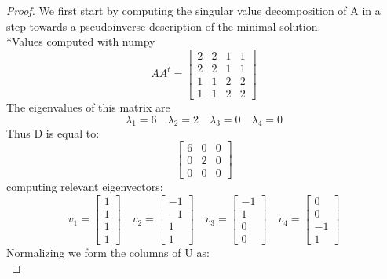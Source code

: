 \documentclass[12pt]{article}
\begin{document}
\begin{proof}
  We first start by computing the singular value decomposition of A in a step towards a pseudoinverse description of the minimal solution. \\
  *Values computed with numpy\\
  \[
    AA^t=\begin{bmatrix}
      2&2&1&1\\2&2&1&1\\1&1&2&2\\1&1&2&2
  \end{bmatrix}
  \]The eigenvalues of this matrix are \[
    \lambda_1=6\quad\lambda_2=2\quad\lambda_3=0\quad\lambda_4=0
  \]
  Thus D is equal to:
  \[
    \begin{bmatrix}
    6&0&0\\0&2&0\\0&0&0
    \end{bmatrix}
  \]
  computing relevant eigenvectors:
  \[
    v_1=\begin{bmatrix}
      1\\1\\1\\1
  \end{bmatrix}\quad v_2=\begin{bmatrix}
    -1\\-1\\1\\1
\end{bmatrix}
\quad v_3=\begin{bmatrix}
  -1\\1\\0\\0
\end{bmatrix}
\quad v_4=\begin{bmatrix}
  0\\0\\-1\\1
\end{bmatrix}
  \]
  Normalizing we form the columns of U as:
  \[

\]
\end{proof}
\end{document}

